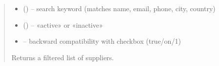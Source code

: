 \documentclass[a4paper,11pt,spanish]{sphinxmanual}
\begin{document}
\begin{fulllineitems}
\label{\detokenize{api/supplier/supplier.services:supplier.services.filter_suppliers}}
\pysigstartsignatures
\pysiglinewithargsret
{}
{\sphinxparamcomma {}\sphinxparamcomma {}}
{}
\pysigstopsignatures\begin{quote}\begin{description}
\begin{itemize}
\item {} 
\sphinxAtStartPar
{} () – search keyword (matches name, email, phone, city, country)

\item {} 
\sphinxAtStartPar
{} () – «active» or «inactive»

\item {} 
\sphinxAtStartPar
{} – backward compatibility with checkbox (true/on/1)

\end{itemize}

\sphinxAtStartPar
Returns a filtered list of suppliers.

\end{description}\end{quote}

\end{fulllineitems}

\end{document}
